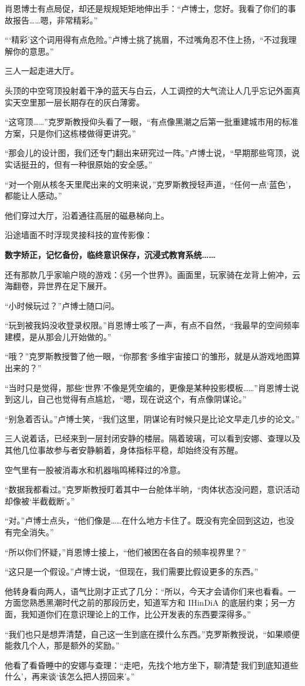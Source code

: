 肖恩博士有点局促，却还是规规矩矩地伸出手：“卢博士，您好。我看了你们的事故报告……嗯，非常精彩。”

“‘精彩’这个词用得有点危险。”卢博士挑了挑眉，不过嘴角忍不住上扬，“不过我理解你的意思。”

三人一起走进大厅。

头顶的中空穹顶投射着干净的蓝天与白云，人工调控的大气流让人几乎忘记外面真实天空里那一层长期存在的灰白薄雾。

“这穹顶……”克罗斯教授仰头看了一眼，“有点像黑潮之后第一批重建城市用的标准方案，只是你们这栋楼做得更讲究。”

“那会儿的设计图，我们还专门翻出来研究过一阵。”卢博士说，“早期那些穹顶，说实话挺丑的，但有一种很原始的安全感。”

“对一个刚从核冬天里爬出来的文明来说，”克罗斯教授轻声道，“任何一点‘蓝色’，都能让人感动。”

他们穿过大厅，沿着通往高层的磁悬梯向上。

沿途墙面不时浮现灵接科技的宣传影像：

\begin{center}
\textbf{数字矫正，记忆备份，临终意识保存，沉浸式教育系统……}
\end{center}

还有那款几乎家喻户晓的游戏：《另一个世界》。画面里，玩家骑在龙背上俯冲，云海翻卷，异世界在足下展开。

“小时候玩过？”卢博士随口问。

“玩到被我妈没收登录权限。”肖恩博士咳了一声，有点不自然，“我最早的空间频率建模，是从那会儿开始做的。”

“哦？”克罗斯教授瞥了他一眼，“你那套‘多维宇宙接口’的雏形，就是从游戏地图算出来的？”

“当时只是觉得，那些‘世界’不像是凭空编的，更像是某种投影模板……”肖恩博士说到这儿，自己也觉得有点尴尬，“嗯，现在说这个，有点像阴谋论。”

“别急着否认。”卢博士笑，“我们这里，阴谋论有时候只是比论文早走几步的论文。”

三人说着话，已经来到一层封闭安静的楼层。隔着玻璃，可以看到安娜、查理以及其他几位事故参与者安静躺着，身体指标平稳，却始终没有苏醒。

空气里有一股被消毒水和机器嗡鸣稀释过的冷意。

“数据我都看过。”克罗斯教授盯着其中一台舱体半晌，“肉体状态没问题，意识活动却像被‘半截截断’。”

“对。”卢博士点头，“他们像是……在什么地方卡住了。既没有完全回到这边，也没有完全消失。”

“所以你们怀疑，”肖恩博士接上，“他们被困在各自的频率视界里？”

“这只是一个假设。”卢博士说，“但现在，我们需要比假设更多的东西。”

他转身看向两人，语气比刚才正式了几分：“所以，今天才会请你们来也看看。一方面您熟悉黑潮时代之前的那段历史，知道军方和 IHinDiA 的底层约束；另一方面，我知道你们在意识理论上的工作，比公开发表的东西要深得多。”

“我们也只是想弄清楚，自己这一生到底在摸什么东西。”克罗斯教授说，“如果顺便能救几个人，那是额外的奖励。”

他看了看昏睡中的安娜与查理：“走吧，先找个地方坐下，聊清楚‘我们到底知道些什么’，再来谈‘该怎么把人捞回来’。”
